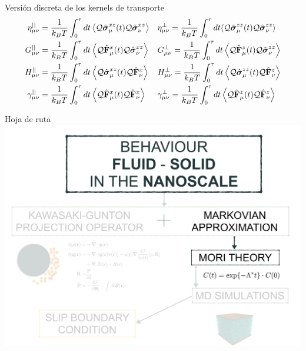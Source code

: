 \documentclass{beamer}
\begin{document}
\begin{frame}{Versión discreta de los kernels de transporte}
\begin{align}
\eta^{||}_{\mu\nu}&
=\frac{1}{k_BT}\int_0^\tau  dt\left\langle 
{\cal Q}\hat{\boldsymbol{\sigma}}^{xz}_\mu(t){\cal Q}\hat{\boldsymbol{\sigma}}^{xz}_\nu
\right\rangle&&
\eta^{\bot}_{\mu\nu}
= \frac{1}{k_BT}\int_0^\tau  dt\langle 
{\cal Q}\hat{\boldsymbol{\sigma}}^{zz}_\mu(t)
{\cal Q}\hat{\boldsymbol{\sigma}}^{zz}_\nu\rangle
\nonumber\\
G^{||}_{\mu\nu}&
=\frac{1}{k_BT} \int_0^\tau  dt
\left\langle{\cal Q}\hat{\bf F}^{x}_\mu(t)
{\cal Q}\hat{\boldsymbol{\sigma}}^{xz}_\nu
\right\rangle&&
G^{\bot}_{\mu\nu}=\frac{1}{k_BT} \int_0^\tau  dt
\left\langle {\cal Q}\hat{\bf F}^{z}_\mu(t)
{\cal Q}\hat{\boldsymbol{\sigma}}^{zz}_\nu
\right\rangle
\nonumber\\
H^{||}_{\mu\nu}&
=\frac{1}{k_BT} 
\int_0^\tau  dt
\left\langle{\cal Q}\hat{\boldsymbol{\sigma}}^{xz}_\mu(t){\cal Q}\hat{\bf F}^{x}_\nu\right\rangle&&
H^\bot_{\mu\nu}=\frac{1}{k_BT} 
\int_0^\tau  dt\left\langle {\cal Q}\hat{\boldsymbol{\sigma}}^{zz}_\mu(t){\cal Q}\hat{\bf F}^{z}_\nu\right\rangle
\nonumber\\
\gamma^{||}_{\mu\nu}&=
\frac{1}{k_BT} \int_0^\tau  dt
\left\langle 
{\cal Q}\hat{\bf F}^{x}_\mu(t)
{\cal Q}\hat{\bf F}^{x}_\nu\right\rangle&&
\gamma^{\bot}_{\mu\nu}=
\frac{1}{k_BT} \int_0^\tau  dt\left\langle 
{\cal Q}\hat{\bf F}^{z}_\mu(t){\cal Q}\hat{\bf F}^{z}_\nu
\right\rangle
\nonumber
\end{align}
\end{frame}

\begin{frame}{Hoja de ruta}
  \includegraphics[width=\linewidth]{scheme-thesis-markovian}
\end{frame}
\end{document}
